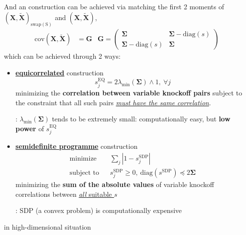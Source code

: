 \documentclass[twoside]{article}
\begin{document}
And an  construction can be achieved via matching the first 2 moments of $(\mathbf{X},\tilde{\mathbf{X}})_{\mathrm{swap(S)}}$ and $(\mathbf{X},\tilde{\mathbf{X}})$,
\begin{align*} \mathrm{cov}(\mathbf{X},\tilde{\mathbf{X}})&=\mathbf{G} & \mathbf{G}=
    \begin{pmatrix}
        \boldsymbol{\Sigma} & \boldsymbol{\Sigma}-\mathrm{diag}(s)\\
        \boldsymbol{\Sigma}-\mathrm{diag}(s) & \boldsymbol{\Sigma}
    \end{pmatrix}
\end{align*}
which can be achieved through 2 ways:
\begin{itemize}
    \item \textcolor{myblue}{\underline{\textbf{equicorrelated}}} construction
    $$
    s^{\mathrm{EQ}}_j = 2\lambda_{\min}(\boldsymbol{\Sigma})\wedge 1,\ \forall j
    $$
    minimizing the {\textbf{correlation between variable knockoff pairs}} subject to the constraint that all such pairs \underline{\textit{must have the same correlation}}.

    : $\lambda_{\min}(\boldsymbol{\Sigma})$ tends to be extremely small: computationally easy, but \textbf{low power} of $s_j^{\mathrm{EQ}}$
    \item \textcolor{myblue}{\underline{\textbf{semidefinite programme}}} construction
    \begin{align*}
        \text{minimize} & & \sum_j\left\vert 1-s_j^{\mathrm{SDP}} \right\vert \\
        \text{subject to} & & s_j^{\mathrm{SDP}}\geq 0, \ \mathrm{diag}\left(s^{\mathrm{SDP}}\right)\preceq 2\boldsymbol{\Sigma}
    \end{align*}
    minimizing the {\textbf{sum of the absolute values}} of variable knockoff correlations between \underline{\textit{all} suitable $s$}

    : SDP (a convex problem) is computationally expensive 
\end{itemize}

in high-dimensional situation
\end{document}
